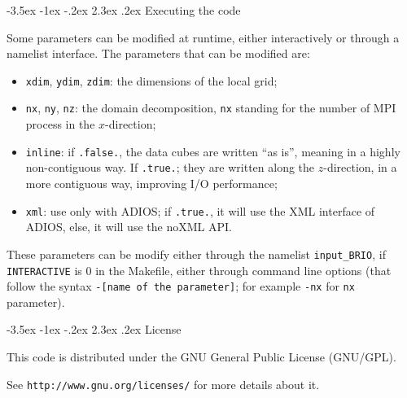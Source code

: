 \documentclass[a4paper,12pt]{article}
\makeatletter
\renewcommand{\section}{\@startsection {section}{1}{\z@}%
             {-3.5ex \@plus -1ex \@minus -.2ex}%
             {2.3ex \@plus .2ex}%
             {\normalfont\Large\sffamily\bfseries}}
\makeatother
\begin{document}
\section{Executing the code}

Some parameters can be modified at runtime, either interactively or through a namelist interface. The parameters that can be modified are:
\begin{itemize}
  \item \texttt{xdim}, \texttt{ydim}, \texttt{zdim}: the dimensions of the local grid;
  \item \texttt{nx}, \texttt{ny}, \texttt{nz}: the domain decomposition, \texttt{nx} standing for the number of MPI process in the $x$-direction;
  \item \texttt{inline}: if \texttt{.false.}, the data cubes are written ``as is'', meaning in a highly non-contiguous way. If \texttt{.true.}; they are written along the $z$-direction, in a more contiguous way, improving I/O performance;
  \item \texttt{xml}: use only with ADIOS; if \texttt{.true.}, it will use the XML interface of ADIOS, else, it will use the noXML API.
\end{itemize}

These parameters can be modify either through the namelist \texttt{input\_BRIO}, if \texttt{INTERACTIVE} is 0 in the Makefile, either through command line options (that follow the syntax \texttt{-[name of the parameter]}; for example \texttt{-nx} for \texttt{nx} parameter).

\section{License}

This code is distributed under the GNU General Public License (GNU/GPL). 

See \texttt{http://www.gnu.org/licenses/} for more details about it.
\end{document}
